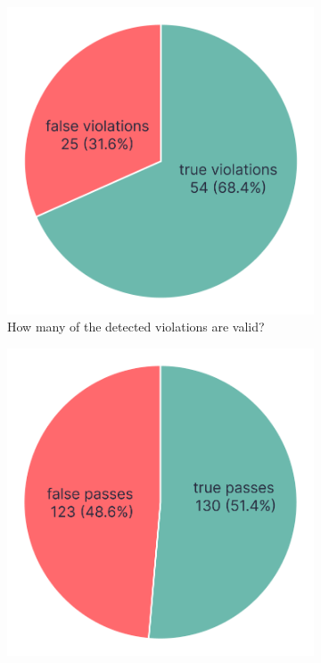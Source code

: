 \documentclass{master_thesis}
\begin{document}
\begin{figure}[ht]
	\centering
	\begin{subfigure}{0.3\textwidth}
	\includegraphics[width=\textwidth]{img/failed-tests.png}
	\caption{How many of the detected violations are valid?}
	\label{fig:checks-validity-failed}
	\end{subfigure}
	\hspace{0.03\textwidth}
	\begin{subfigure}{0.3\textwidth}
	\includegraphics[width=\textwidth]{img/passed-tests.png}

\end{subfigure}
\end{figure}
\end{document}
